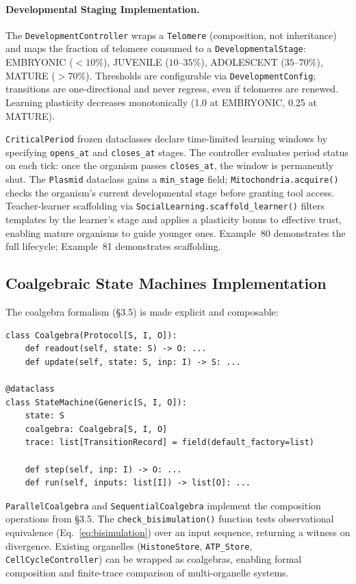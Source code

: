 \paragraph{Developmental Staging Implementation.}
\label{sec:developmental-impl}
The \texttt{DevelopmentController} wraps a \texttt{Telomere} (composition, not inheritance) and maps the fraction of telomere consumed to a \texttt{DevelopmentalStage}: EMBRYONIC ($<10\%$), JUVENILE ($10\text{--}35\%$), ADOLESCENT ($35\text{--}70\%$), MATURE ($>70\%$). Thresholds are configurable via \texttt{DevelopmentConfig}; transitions are one-directional and never regress, even if telomeres are renewed. Learning plasticity decreases monotonically (1.0 at EMBRYONIC, 0.25 at MATURE).

\texttt{CriticalPeriod} frozen dataclasses declare time-limited learning windows by specifying \texttt{opens\_at} and \texttt{closes\_at} stages. The controller evaluates period status on each tick: once the organism passes \texttt{closes\_at}, the window is permanently shut. The \texttt{Plasmid} dataclass gains a \texttt{min\_stage} field; \texttt{Mitochondria.acquire()} checks the organism's current developmental stage before granting tool access. Teacher-learner scaffolding via \texttt{SocialLearning.scaffold\_learner()} filters templates by the learner's stage and applies a plasticity bonus to effective trust, enabling mature organisms to guide younger ones. Example~80 demonstrates the full lifecycle; Example~81 demonstrates scaffolding.

\subsection{Coalgebraic State Machines Implementation}

The coalgebra formalism (\S3.5) is made explicit and composable:

\begin{verbatim}
class Coalgebra(Protocol[S, I, O]):
    def readout(self, state: S) -> O: ...
    def update(self, state: S, inp: I) -> S: ...

@dataclass
class StateMachine(Generic[S, I, O]):
    state: S
    coalgebra: Coalgebra[S, I, O]
    trace: list[TransitionRecord] = field(default_factory=list)

    def step(self, inp: I) -> O: ...
    def run(self, inputs: list[I]) -> list[O]: ...
\end{verbatim}

\texttt{ParallelCoalgebra} and \texttt{SequentialCoalgebra} implement the composition operations from \S3.5. The \texttt{check\_bisimulation()} function tests observational equivalence (Eq.~\eqref{eq:bisimulation}) over an input sequence, returning a witness on divergence. Existing organelles (\texttt{HistoneStore}, \texttt{ATP\_Store}, \texttt{CellCycleController}) can be wrapped as coalgebras, enabling formal composition and finite-trace comparison of multi-organelle systems.

